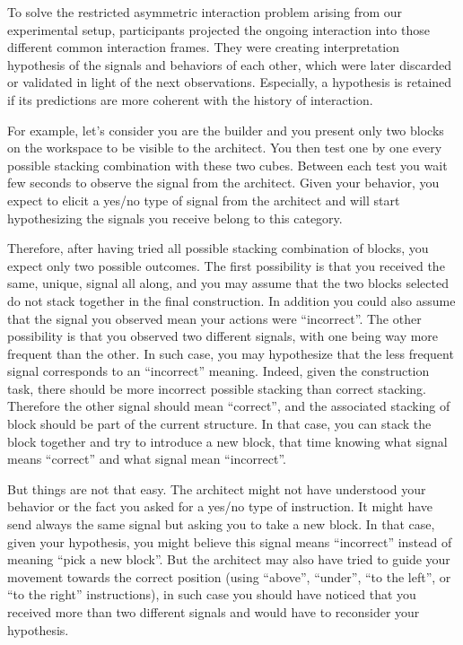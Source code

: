 To solve the restricted asymmetric interaction problem arising from our experimental setup, participants projected the ongoing interaction into those different common interaction frames. They were creating interpretation hypothesis of the signals and behaviors of each other, which were later discarded or validated in light of the next observations. Especially, a hypothesis is retained if its predictions are more coherent with the history of interaction.

For example, let's consider you are the builder and you present only two blocks on the workspace to be visible to the architect. You then test one by one every possible stacking combination with these two cubes. Between each test you wait few seconds to observe the signal from the architect. Given your behavior, you expect to elicit a yes/no type of signal from the architect and will start hypothesizing the signals you receive belong to this category.

Therefore, after having tried all possible stacking combination of blocks, you expect only two possible outcomes. The first possibility is that you received the same, unique, signal all along, and you may assume that the two blocks selected do not stack together in the final construction. In addition you could also assume that the signal you observed mean your actions were ``incorrect''. The other possibility is that you observed two different signals, with one being way more frequent than the other. In such case, you may hypothesize that the less frequent signal corresponds to an ``incorrect'' meaning. Indeed, given the construction task, there should be more incorrect possible stacking than correct stacking. Therefore the other signal should mean ``correct'', and the associated stacking of block should be part of the current structure. In that case, you can stack the block together and try to introduce a new block, that time knowing what signal means ``correct'' and what signal mean ``incorrect''.

But things are not that easy. The architect might not have understood your behavior or the fact you asked for a yes/no type of instruction. It might have send always the same signal but asking you to take a new block. In that case, given your hypothesis, you might believe this signal means ``incorrect'' instead of meaning ``pick a new block''. But the architect may also have tried to guide your movement towards the correct position (using ``above'', ``under'', ``to the left'', or ``to the right'' instructions), in such case you should have noticed that you received more than two different signals and would have to reconsider your hypothesis.

